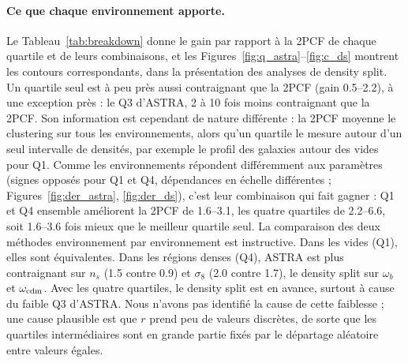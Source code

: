 \paragraph{Ce que chaque environnement apporte.} Le Tableau~\ref{tab:breakdown} donne le gain par rapport à la 2PCF de chaque quartile et de leurs combinaisons, et les Figures~\ref{fig:q_astra}--\ref{fig:c_ds} montrent les contours correspondants, dans la présentation des analyses de density split. Un quartile seul est à peu près aussi contraignant que la 2PCF (gain 0.5--2.2), à une exception près : le Q3 d'ASTRA, 2 à 10 fois moins contraignant que la 2PCF. Son information est cependant de nature différente : la 2PCF moyenne le clustering sur tous les environnements, alors qu'un quartile le mesure autour d'un seul intervalle de densités, par exemple le profil des galaxies autour des vides pour Q1. Comme les environnements répondent différemment aux paramètres (signes opposés pour Q1 et Q4, dépendances en échelle différentes ; Figures~\ref{fig:der_astra}, \ref{fig:der_ds}), c'est leur combinaison qui fait gagner : Q1 et Q4 ensemble améliorent la 2PCF de 1.6--3.1, les quatre quartiles de 2.2--6.6, soit 1.6--3.6 fois mieux que le meilleur quartile seul. La comparaison des deux méthodes environnement par environnement est instructive. Dans les vides (Q1), elles sont équivalentes. Dans les régions denses (Q4), ASTRA est plus contraignant sur $n_s$ (1.5 contre 0.9) et $\sigma_8$ (2.0 contre 1.7), le density split sur $\omega_b$ et $\omega_{\rm cdm}$. Avec les quatre quartiles, le density split est en avance, surtout à cause du faible Q3 d'ASTRA. Nous n'avons pas identifié la cause de cette faiblesse ; une cause plausible est que $r$ prend peu de valeurs discrètes, de sorte que les quartiles intermédiaires sont en grande partie fixés par le départage aléatoire entre valeurs égales.

